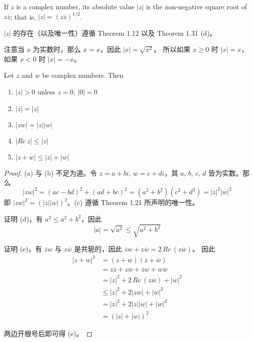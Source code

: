 \documentclass[../poma-notes.tex]{subfiles}
\begin{document}
\begin{definition}
	If $z$ is a complex number, its absolute value $|z|$ is the non-negative square root of $z\overline{z}$;
	that is, $|z| = (z\overline{z})^{1/2}$.
\end{definition}

$|z|$ 的存在（以及唯一性）遵循 Theorem 1.12 以及 Theorem 1.31 (d)。

注意当 $x$ 为实数时，那么 $\overline{x} = x$，因此 $|x| = \sqrt{x^2}$。
所以如果 $x \ge 0$ 时 $|x| = x$，如果 $x<0$ 时 $|x| = -x$。

\begin{theorem}
	Let $z$ and $w$ be complex numbers. Then
	\begin{enumerate}[label=(\alph*)]
		\item $|z|>0$ unless $z=0,\,|0|=0$
		\item $|\overline{z}|=|z|$
		\item $|zw|=|z||w|$
		\item $|Re \, z| \le |z|$
		\item $|z+w| \le |z|+|w|$
	\end{enumerate}
\end{theorem}

\begin{proof}
	(a) 与 (b) 不足为道。令 $z=a+bi,\,w=c+di$，其 $a,\,b,\,c,\,d$ 皆为实数。那么
	\[|zw|^2 = (ac-bd)^2 + (ad+bc)^2 = (a^2+b^2)(c^2+d^2) = |z|^2|w|^2\]
	即 $|zw|^2 = (|z||w|)^2$。(c) 遵循 Theorem 1.21 所声明的唯一性。

	证明 (d)，有 $a^2 \le a^2 + b^2$，因此
	\[|a| = \sqrt{a^2} \le \sqrt{a^2 + b^2}\]

	证明 (e)，有 $\overline{z}w$ 与 $z\overline{w}$ 是共轭的，因此 $\overline{z}w + z\overline{w} = 2\, Re\,(z\overline{w})$。
	因此
	\begin{align*}
		\mathcal |z+w|^2 & = (z+w)(\overline{z}+\overline{w})                              \\
		                 & = z\overline{z} + z\overline{w} + \overline{z}w + w\overline{w} \\
		                 & = |z|^2 + 2\,Re\,(z\overline{w}) + |w|^2                        \\
		                 & \le |z|^2 + 2|z\overline{w}| + |w|^2                            \\
		                 & = |z|^2 + 2|z||w| + |w|^2                                       \\
		                 & = (|z|+|w|)^2
	\end{align*}

	两边开根号后即可得 (e)。
\end{proof}
\end{document}

